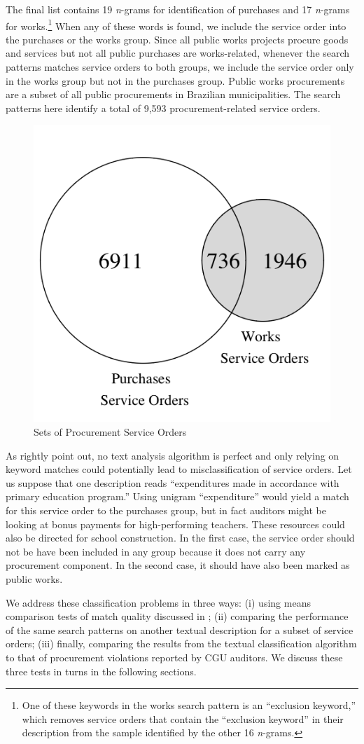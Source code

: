 \documentclass[11pt]{article}
\begin{document}
The final list contains 19 \emph{n}-grams for identification of purchases and 17 \emph{n}-grams for works.\footnote{One of these keywords in the works search pattern is an ``exclusion keyword,'' which removes service orders that contain the ``exclusion keyword'' in their description from the sample identified by the other 16 \emph{n}-grams.} When any of these words is found, we include the service order into the purchases or the works group. Since all public works projects procure goods and services but not all public purchases are works-related, whenever the search patterns matches service orders to both groups, we include the service order only in the works group but not in the purchases group. Public works procurements are a subset of all public procurements in Brazilian municipalities. The search patterns here identify a total of 9,593 procurement-related service orders.

\begin{figure}[!htbp]
\caption{\label{fig:venn} Sets of Procurement Service Orders}
{\centering \includegraphics[width=0.3\linewidth]{venn}

}
\end{figure}

As \citet{GrimmerTextDataPromise2013a} rightly point out, no text analysis algorithm is perfect and only relying on keyword matches could potentially lead to misclassification of service orders. Let us suppose that one description reads ``expenditures made in accordance with primary education program.'' Using unigram ``expenditure'' would yield a match for this service order to the purchases group, but in fact auditors might be looking at bonus payments for high-performing teachers. These resources could also be directed for school construction. In the first case, the service order should not be have been included in any group because it does not carry any procurement component. In the second case, it should have also been marked as public works.

We address these classification problems in three ways: (i) using means comparison tests of match quality discussed in \citet{AssumpcaotextfindDataDrivenText2018}; (ii) comparing the performance of the same search patterns on another textual description for a subset of service orders; (iii) finally, comparing the results from the textual classification algorithm to that of procurement violations reported by CGU auditors. We discuss these three tests in turns in the following sections.
\end{document}
